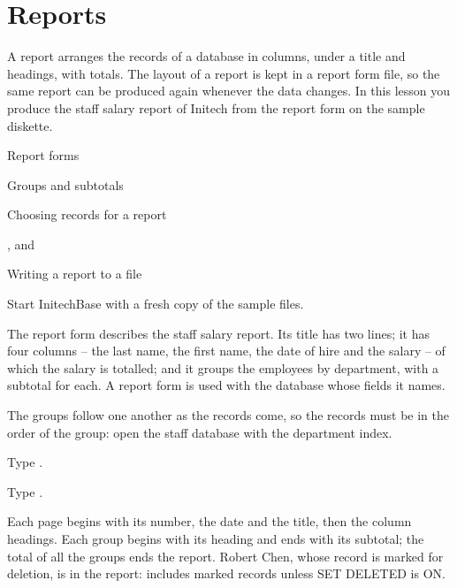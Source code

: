 \chapter{Reports}
A report arranges the records of a database in columns, under a title and
headings, with totals.  The layout of a report is kept in a report form file,
so the same report can be produced again whenever the data changes.  In this
lesson you produce the staff salary report of Initech from the report form on
the sample diskette.

\begin{ChapterCovers}
\item Report forms
\item {}
\item Groups and subtotals
\item Choosing records for a report
\item {},  and 
\item Writing a report to a file
\end{ChapterCovers}

Start InitechBase with a fresh copy of the sample files.

The report form  describes the staff salary report.  Its
title has two lines; it has four columns -- the last name, the first name, the
date of hire and the salary -- of which the salary is totalled; and it groups
the employees by department, with a subtotal for each.  A report form is used
with the database whose fields it names.

The groups follow one another as the records come, so the records must be in
the order of the group: open the staff database with the department index.

\begin{Steps}
\item Type .
\item Type .
\end{Steps}
Each page begins with its number, the date and the title, then the column
headings.  Each group begins with its heading and ends with its subtotal; the
total of all the groups ends the report.  Robert Chen, whose record is marked
for deletion, is in the report:  includes marked records
unless SET DELETED is ON.

